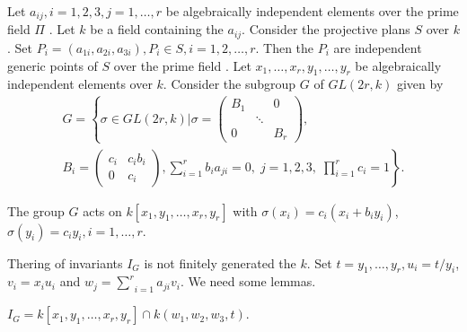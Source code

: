 Let $a_{ij}, i = 1,2,3, j = 1, \ldots , r$ be algebraically
independent elements over the prime field $\Pi$ . Let $k$ be a field
containing the $a_{ij}$. Consider the projective plans $S$ over
$k$. Set $P_{i} = (a_{1i}, a_{2i}, a_{3i}), P_{i} \in S, i =
1,2,\ldots ,r$. Then the $P_{i}$ are independent generic points of
$S$ over the prime field . Let $ x_{1}, \ldots , x_{r}, y_{1}, \ldots
,y_{r}$ be algebraically independent elements over $k$. Consider the
subgroup $G$ of $GL (2r, k)$ given by 
\begin{multline*}
 G = \left\{ \sigma \in GL (2r, k) \bigg| \sigma = 
 \begin{pmatrix}
 B_1 & & 0 \\ 
& \ddots & \\
 0 & &  B_r 
\end{pmatrix},\right. \\ 
 \left.B_i = \begin{pmatrix}
 c_i & c_i b_i\\
0 & c_i 
\end{pmatrix},
 \sum\limits^{r}_{i=1} b_{i} a_{ji} = 0, \; j =1, 2,
 3, \; \prod\limits^{r}_{i=1} c_{i} = 1\right\}. 
\end{multline*}

The group $G$ acts on $k[x_{1}, y_{1},\ldots , x_{r}, y_{r}]$ with $
\sigma (x_{i}) = c_{i}(x_{i}+b_{i}y_{i})$, $\sigma(y_{i}) = c_{i} y_{i},
i =1, \ldots , r$.  
  
\setcounter{thm}{0}
\begin{thm}\label{chap3:sec2:thm1}%
 The\pageoriginale ring of invariants $I_G$ is not finitely generated
 the $k$. Set $ t= y_1 , \dots , y_{r}, u_{ i} = t/y_i$, $v_i = x_i u_i$
 and $w_j = \underset{i=1}{\overset{r}{\sum}} a_{ji}v_i$. We need
 some lemmas.  
\end{thm}


\setcounter{lem}{0}
\begin{lem}\label{chap3:sec2:lem1}%
 $I_G = k [x_1, y_1, \dots , x_r, y_r]\cap k(w_1, w_2, w_3, t)$.
\end{lem}

